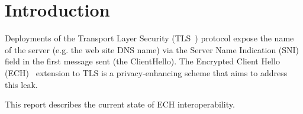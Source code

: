 \section{Introduction}

Deployments of the Transport Layer Security (TLS~\cite{rfc8446}) protocol
expose the name of the server (e.g. the web site DNS name) via the Server Name
Indication (SNI) field in the first message sent (the ClientHello).  The
Encrypted Client Hello (ECH)~\cite{draft-ietf-tls-esni} extension to TLS is a
privacy-enhancing scheme that aims to address this leak.

This report describes the current state of ECH interoperability.
